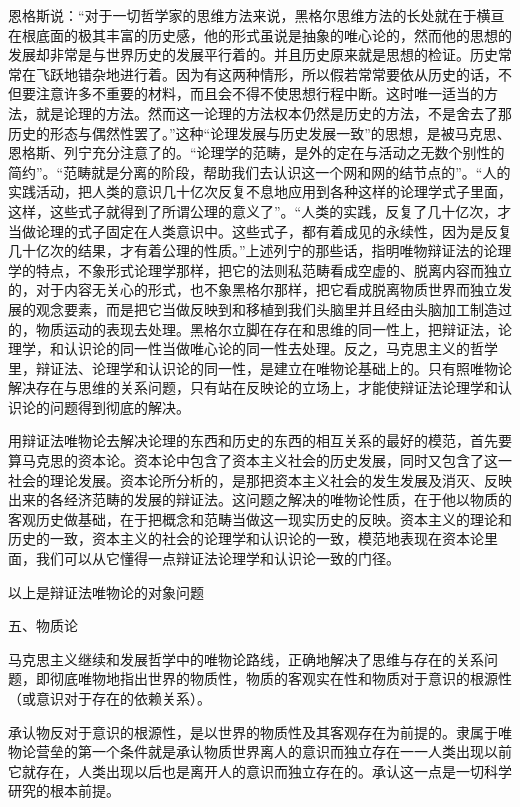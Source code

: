 恩格斯说：“对于一切哲学家的思维方法来说，黑格尔思维方法的长处就在于横亘在根底面的极其丰富的历史感，他的形式虽说是抽象的唯心论的，然而他的思想的发展却非常是与世界历史的发展平行着的。并且历史原来就是思想的检证。历史常常在飞跃地错杂地进行着。因为有这两种情形，所以假若常常要依从历史的话，不但要注意许多不重要的材料，而且会不得不使思想行程中断。这时唯一适当的方法，就是论理的方法。然而这一论理的方法权本仍然是历史的方法，不是舍去了那历史的形态与偶然性罢了。”这种“论理发展与历史发展一致”的思想，是被马克思、恩格斯、列宁充分注意了的。“论理学的范畴，是外的定在与活动之无数个别性的简约”。“范畴就是分离的阶段，帮助我们去认识这一个网和网的结节点的”。“人的实践活动，把人类的意识几十亿次反复不息地应用到各种这样的论理学式子里面，这样，这些式子就得到了所谓公理的意义了”。“人类的实践，反复了几十亿次，才当做论理的式子固定在人类意识中。这些式子，都有着成见的永续性，因为是反复几十亿次的结果，才有着公理的性质。”上述列宁的那些话，指明唯物辩证法的论理学的特点，不象形式论理学那样，把它的法则私范畴看成空虚的、脱离内容而独立的，对于内容无关心的形式，也不象黑格尔那样，把它看成脱离物质世界而独立发展的观念要素，而是把它当做反映到和移植到我们头脑里并且经由头脑加工制造过的，物质运动的表现去处理。黑格尔立脚在存在和思维的同一性上，把辩证法，论理学，和认识论的同一性当做唯心论的同一性去处理。反之，马克思主义的哲学里，辩证法、论理学和认识论的同一性，是建立在唯物论基础上的。只有照唯物论解决存在与思维的关系问题，只有站在反映论的立场上，才能使辩证法论理学和认识论的问题得到彻底的解决。

用辩证法唯物论去解决论理的东西和历史的东西的相互关系的最好的模范，首先要算马克思的资本论。资本论中包含了资本主义社会的历史发展，同时又包含了这一社会的理论发展。资本论所分析的，是那把资本主义社会的发生发展及消灭、反映出来的各经济范畴的发展的辩证法。这问题之解决的唯物论性质，在于他以物质的客观历史做基础，在于把概念和范畴当做这一现实历史的反映。资本主义的理论和历史的一致，资本主义的社会的论理学和认识论的一致，模范地表现在资本论里面，我们可以从它懂得一点辩证法论理学和认识论一致的门径。

以上是辩证法唯物论的对象问题

五、物质论

马克思主义继续和发展哲学中的唯物论路线，正确地解决了思维与存在的关系问题，即彻底唯物地指出世界的物质性，物质的客观实在性和物质对于意识的根源性（或意识对于存在的依赖关系）。

承认物反对于意识的根源性，是以世界的物质性及其客观存在为前提的。隶属于唯物论营垒的第一个条件就是承认物质世界离人的意识而独立存在一一人类出现以前它就存在，人类出现以后也是离开人的意识而独立存在的。承认这一点是一切科学研究的根本前提。

